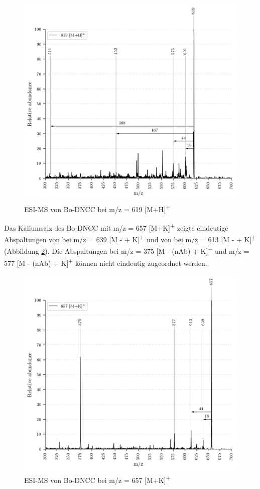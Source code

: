 \begin{figure}[!htbp]
  \includegraphics[width=\textwidth, height=0.7\textwidth]{figures/Kapitel4/Kataboliten/VWA_MS_LeafSpray_619.png}
  \caption[ESI-MS von Bo-DNCC, Quelle: Autor]{ESI-MS von Bo-DNCC bei m/z = 619 [M+H]\textsuperscript{+}}
  \label{fig:619MHLeafspray}
\end{figure}

Das Kaliumsalz des Bo-DNCC mit m/z = 657 [M+K]\textsuperscript{+} zeigte eindeutige Abspaltungen von  bei m/z = 639 [M -  + K]\textsuperscript{+} und von  bei m/z = 613 [M -  + K]\textsuperscript{+} (Abbildung \ref{fig:657MKLeafspray}). Die Abspaltungen bei m/z = 375 [M - (\gls{nAb}) + K]\textsuperscript{+} und m/z = 577 [M - (\gls{nAb}) + K]\textsuperscript{+} können nicht eindeutig zugeordnet werden.

\begin{figure}[!htbp]
  \includegraphics[width=\textwidth, height=0.7\textwidth]{figures/Kapitel4/Kataboliten/VWA_MS_LeafSpray_657.png}
  \caption[ESI-MS von Bo-DNCC, Quelle: Autor]{ESI-MS von Bo-DNCC bei m/z = 657 [M+K]\textsuperscript{+}}
  \label{fig:657MKLeafspray}
\end{figure}

